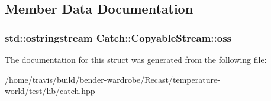 \subsection{Member Data Documentation}
\hypertarget{struct_catch_1_1_copyable_stream_ae123fb4d673e7d7a13a3c5f6bc5d426c}{
\subsubsection[{oss}]{\setlength{\rightskip}{0pt plus 5cm}std\-::ostringstream Catch\-::\-Copyable\-Stream\-::oss}}\label{struct_catch_1_1_copyable_stream_ae123fb4d673e7d7a13a3c5f6bc5d426c}


The documentation for this struct was generated from the following file\-:\begin{DoxyCompactItemize}
\item 
/home/travis/build/bender-\/wardrobe/\-Recast/temperature-\/world/test/lib/\hyperlink{catch_8hpp}{catch.\-hpp}\end{DoxyCompactItemize}
